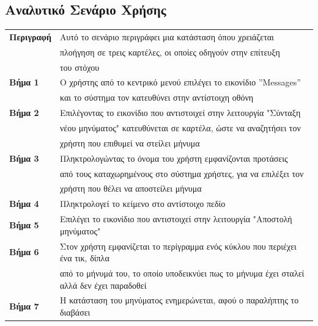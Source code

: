 \documentclass{article}
\newcommand\T{\rule{0pt}{2.6ex}}       %
\newcommand\B{\rule[-1.2ex]{0pt}{0pt}}
\begin{document}
\newpage

\subsection{Αναλυτικό Σενάριο Χρήσης}

 \begin{center}
     \begin{tabular}{|l|l|}
     \hline
      \textbf{Περιγραφή} & Αυτό το σενάριο περιγράφει μια κατάσταση όπου χρειάζεται \T \\& πλοήγηση σε τρεις καρτέλες, οι οποίες οδηγούν στην επίτευξη \\& του στόχου \B \\ 
      \hline
      \textbf{Βήμα 1} & Ο χρήστης από το κεντρικό μενού επιλέγει το εικονίδιο ”Messages” \T \\& και το σύστημα τον κατευθύνει στην αντίστοιχη οθόνη \B \\
      \hline
      \textbf{Βήμα 2} & Επιλέγοντας το εικονίδιο που αντιστοιχεί στην λειτουργία "Σύνταξη \T \\& νέου μηνύματος" κατευθύνεται σε καρτέλα, ώστε να αναζητήσει τον \\& χρήστη που επιθυμεί να στείλει μήνυμα \B \\
      \hline
      \textbf{Βήμα 3} & Πληκτρολογώντας το όνομα του χρήστη εμφανίζονται προτάσεις \T \\& από τους καταχωρημένους στο σύστημα χρήστες, για να επιλέξει τον \\& χρήστη που θέλει να αποστείλει μήνυμα \B \\
      \hline
      \textbf{Βήμα 4} & Πληκτρολογεί το κείμενο στο αντίστοιχο πεδίο \T\B \\
      \hline
      \textbf{Βήμα 5} &  Επιλέγει το εικονίδιο που αντιστοιχεί στην  λειτουργία "Αποστολή μηνύματος"\T\B \\
      \hline
      \textbf{Βήμα 6} & Στον χρήστη εμφανίζεται το περίγραμμα ενός κύκλου που περιέχει ένα τικ, δίπλα \T \\& από το μήνυμά του, το οποίο υποδεικνύει πως το μήνυμα έχει σταλεί αλλά δεν έχει παραδοθεί \B \\
      \hline
      \textbf{Βήμα 7} & Η κατάσταση του μηνύματος ενημερώνεται, αφού ο παραλήπτης το διαβάσει \T\B \\
      \hline
     \end{tabular}
 \end{center}
 
\vspace{0.2cm}
 
\end{document}
